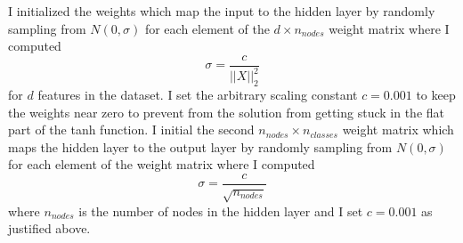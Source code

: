 \documentclass[12pt]{amsart}
\begin{document}
I initialized the weights which map the input to the hidden layer by randomly sampling from $N(0,\sigma)$ for each element of the $d \times n_{nodes}$ weight matrix where I computed 
\begin{equation}
\sigma = \frac{c}{||X||^2_2}
\end{equation}
for $d$ features in the dataset.  I set the arbitrary scaling constant $c = 0.001$ to keep the weights near zero to prevent from the solution from getting stuck in the flat part of the tanh function.  I initial the second $n_{nodes} \times n_{classes}$ weight matrix which maps the hidden layer to the output layer by randomly sampling from $N(0,\sigma)$ for each element of the weight matrix where I computed 
\begin{equation}
\sigma = \frac{c}{\sqrt{n_{nodes}}}
\end{equation}
where $n_{nodes}$ is the number of nodes in the hidden layer and I set $c = 0.001$ as justified above.
\end{document}
